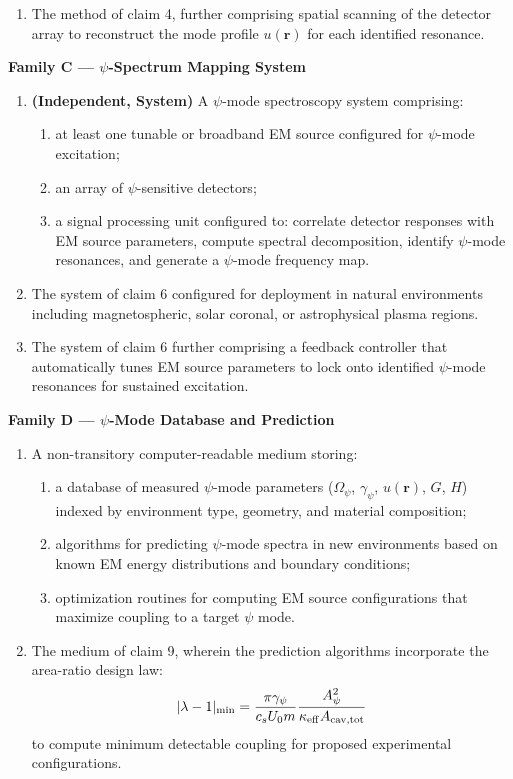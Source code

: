 \documentclass[12pt,letterpaper]{article}
\begin{document}
\begin{tcolorbox}[colback=blue!5!white, colframe=blue!50!black,
title=Patent \#16 -- Proposed Claims]
\begin{enumerate}[resume]
\item The method of claim 4, further comprising spatial scanning of
the detector array to reconstruct the mode profile $u(\mathbf{r})$
for each identified resonance.
\end{enumerate}

\textbf{Family C --- $\psi$-Spectrum Mapping System}
\begin{enumerate}[resume]
\item \textbf{(Independent, System)} A $\psi$-mode spectroscopy system
comprising:
\begin{enumerate}[label=(\alph*)]
\item at least one tunable or broadband EM source configured for
$\psi$-mode excitation;
\item an array of $\psi$-sensitive detectors;
\item a signal processing unit configured to: correlate detector
responses with EM source parameters, compute spectral decomposition,
identify $\psi$-mode resonances, and generate a $\psi$-mode frequency
map.
\end{enumerate}

\item The system of claim 6 configured for deployment in natural
environments including magnetospheric, solar coronal, or astrophysical
plasma regions.

\item The system of claim 6 further comprising a feedback controller
that automatically tunes EM source parameters to lock onto identified
$\psi$-mode resonances for sustained excitation.
\end{enumerate}

\textbf{Family D --- $\psi$-Mode Database and Prediction}
\begin{enumerate}[resume]
\item A non-transitory computer-readable medium storing:
\begin{enumerate}[label=(\alph*)]
\item a database of measured $\psi$-mode parameters
($\Omega_\psi$, $\gamma_\psi$, $u(\mathbf{r})$, $G$, $H$) indexed
by environment type, geometry, and material composition;
\item algorithms for predicting $\psi$-mode spectra in new environments
based on known EM energy distributions and boundary conditions;
\item optimization routines for computing EM source configurations that
maximize coupling to a target $\psi$ mode.
\end{enumerate}

\item The medium of claim 9, wherein the prediction algorithms
incorporate the area-ratio design law:
\[
|\lambda-1|_{\rm min} = \frac{\pi\gamma_\psi}{c_s U_0 m}
\frac{A_\psi^2}{\kappa_{\rm eff}A_{\rm cav,tot}}
\]
to compute minimum detectable coupling for proposed experimental
configurations.
\end{enumerate}
\end{tcolorbox}
\end{document}
